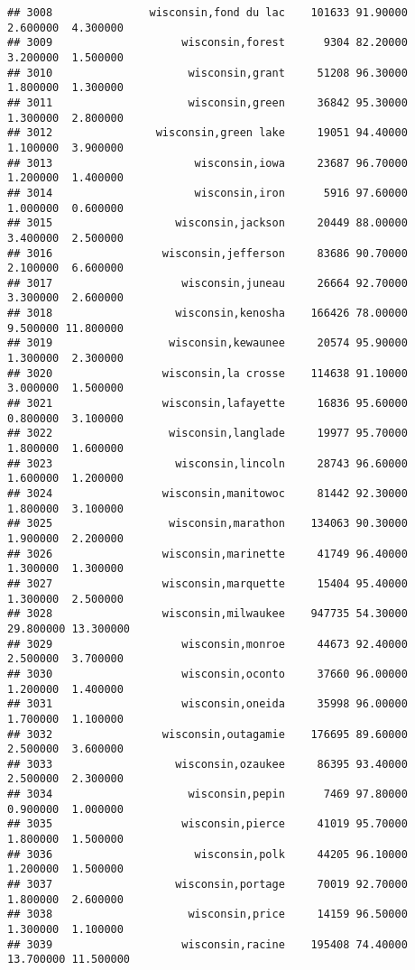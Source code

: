 \documentclass[
]{article}
\begin{document}
\begin{verbatim}
## 3008               wisconsin,fond du lac    101633 91.90000  2.600000  4.300000
## 3009                    wisconsin,forest      9304 82.20000  3.200000  1.500000
## 3010                     wisconsin,grant     51208 96.30000  1.800000  1.300000
## 3011                     wisconsin,green     36842 95.30000  1.300000  2.800000
## 3012                wisconsin,green lake     19051 94.40000  1.100000  3.900000
## 3013                      wisconsin,iowa     23687 96.70000  1.200000  1.400000
## 3014                      wisconsin,iron      5916 97.60000  1.000000  0.600000
## 3015                   wisconsin,jackson     20449 88.00000  3.400000  2.500000
## 3016                 wisconsin,jefferson     83686 90.70000  2.100000  6.600000
## 3017                    wisconsin,juneau     26664 92.70000  3.300000  2.600000
## 3018                   wisconsin,kenosha    166426 78.00000  9.500000 11.800000
## 3019                  wisconsin,kewaunee     20574 95.90000  1.300000  2.300000
## 3020                 wisconsin,la crosse    114638 91.10000  3.000000  1.500000
## 3021                 wisconsin,lafayette     16836 95.60000  0.800000  3.100000
## 3022                  wisconsin,langlade     19977 95.70000  1.800000  1.600000
## 3023                   wisconsin,lincoln     28743 96.60000  1.600000  1.200000
## 3024                 wisconsin,manitowoc     81442 92.30000  1.800000  3.100000
## 3025                  wisconsin,marathon    134063 90.30000  1.900000  2.200000
## 3026                 wisconsin,marinette     41749 96.40000  1.300000  1.300000
## 3027                 wisconsin,marquette     15404 95.40000  1.300000  2.500000
## 3028                 wisconsin,milwaukee    947735 54.30000 29.800000 13.300000
## 3029                    wisconsin,monroe     44673 92.40000  2.500000  3.700000
## 3030                    wisconsin,oconto     37660 96.00000  1.200000  1.400000
## 3031                    wisconsin,oneida     35998 96.00000  1.700000  1.100000
## 3032                 wisconsin,outagamie    176695 89.60000  2.500000  3.600000
## 3033                   wisconsin,ozaukee     86395 93.40000  2.500000  2.300000
## 3034                     wisconsin,pepin      7469 97.80000  0.900000  1.000000
## 3035                    wisconsin,pierce     41019 95.70000  1.800000  1.500000
## 3036                      wisconsin,polk     44205 96.10000  1.200000  1.500000
## 3037                   wisconsin,portage     70019 92.70000  1.800000  2.600000
## 3038                     wisconsin,price     14159 96.50000  1.300000  1.100000
## 3039                    wisconsin,racine    195408 74.40000 13.700000 11.500000

\end{verbatim}
\end{document}
